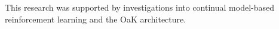 \documentclass{article}
\theoremstyle{definition}
\begin{document}
\begin{ack}
This research was supported by investigations into continual model-based reinforcement learning and the OaK architecture.
\end{ack}




\end{document}
